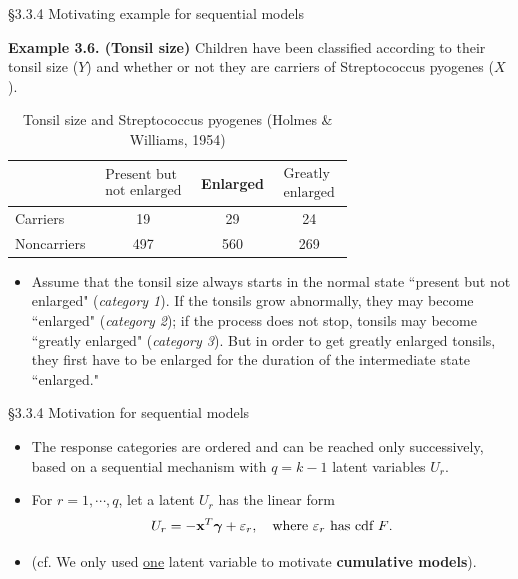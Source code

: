 \documentclass{beamer}
\newenvironment{wideitemize}%
  {\begin{itemize}%
    \setlength{\parskip}{1em}}%
  {\end{itemize}}
\begin{document}
\begin{frame}{\S3.3.4 Motivating example for sequential models}
%

\noindent \textbf{Example 3.6. (Tonsil size)} Children have been classified according to their tonsil size ($Y$) 
and whether or not they are carriers of Streptococcus pyogenes ($X$). 
\begin{table} [htbp]
\caption{Tonsil size and Streptococcus pyogenes (Holmes \& Williams, 1954)} \label{tab3.5}
\begin{center} {\small
\begin{tabular}{|lccc|} \hline
 & $\begin{array}{c} \mbox{Present but} \\ \mbox{not enlarged}\end{array}$ & Enlarged & 
 $\begin{array}{c} \mbox{Greatly} \\ \mbox{enlarged}\end{array}$ \\ \hline
Carriers & 19 & 29 & 24 \\
Noncarriers & 497 & 560 & 269 \\ \hline
\end{tabular}}
\end{center}
\end{table}
\begin{itemize}
\item
{\scriptsize Assume that the tonsil size always starts in the normal state ``present
but not enlarged" (\textit{category 1}). If the tonsils grow abnormally, they may
become ``enlarged" (\textit{category 2}); if the process does not stop, tonsils may
become ``greatly enlarged" (\textit{category 3}). But in order to get greatly enlarged
tonsils, they first have to be enlarged for the duration of the intermediate
state ``enlarged."}
\end{itemize}
\end{frame}


\begin{frame}{\S3.3.4 Motivation for sequential models}
\begin{wideitemize}
\item
The response categories are ordered and  can be reached only successively, based on  a sequential mechanism with $q = k - 1$ latent variables $U_r$. 

\item
For $r=1,\cdots,q$, let
a  latent  $U_r$ has the linear form
$$U_r=-\textbf{x}^T\mbox{\boldmath $\gamma$}+\varepsilon_r, \quad\mbox{where $\varepsilon_r$
has cdf $F$.}$$


\item (cf. We only used \underline{one} latent variable to motivate {\bf cumulative models}).
%



\end{wideitemize}
\end{frame}
\end{document}
